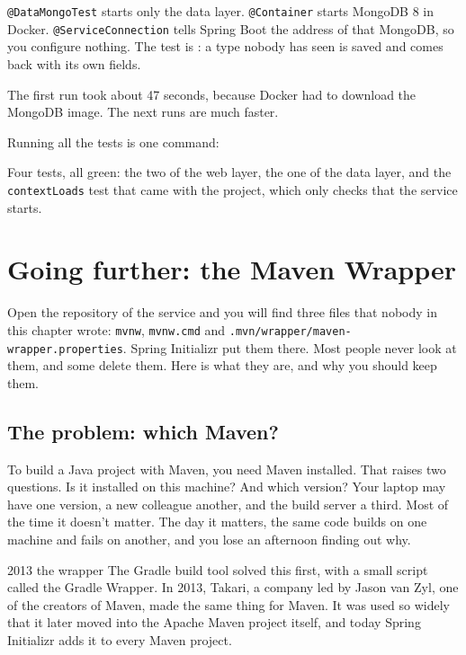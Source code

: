 \texttt{@DataMongoTest} starts only the data layer. \texttt{@Container}
starts MongoDB 8 in Docker. \texttt{@ServiceConnection} tells Spring Boot the
address of that MongoDB, so you configure nothing. The test is :
a type nobody has seen is saved and comes back with its own fields.

The first run took about 47 seconds, because Docker had to download the
MongoDB image. The next runs are much faster.

Running all the tests is one command:


Four tests, all green: the two of the web layer, the one of the data layer,
and the \texttt{contextLoads} test that came with the project, which only
checks that the service starts.

\section{Going further: the Maven Wrapper}

Open the repository of the service and you will find three files that nobody
in this chapter wrote: \texttt{mvnw}, \texttt{mvnw.cmd} and
\texttt{.mvn/wrapper/maven-wrapper.properties}. Spring Initializr put them
there. Most people never look at them, and some delete them. Here is what
they are, and why you should keep them.

\subsection*{The problem: which Maven?}

To build a Java project with Maven, you need Maven installed. That raises two
questions. Is it installed on this machine? And which version? Your laptop
may have one version, a new colleague another, and the build server a third.
Most of the time it doesn't matter. The day it matters, the same code builds
on one machine and fails on another, and you lose an afternoon finding out
why.

\begin{history}{2013 \textperiodcentered{} the wrapper}
The Gradle build tool solved this first, with a small script called the
Gradle Wrapper. In 2013, Takari, a company led by Jason van Zyl, one of the
creators of Maven, made the same thing for Maven. It was used so widely that
it later moved into the Apache Maven project itself, and today Spring
Initializr adds it to every Maven project.
\end{history}

